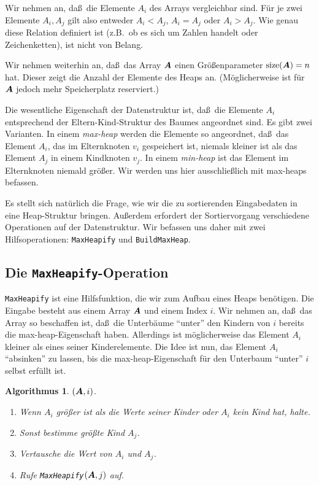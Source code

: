 \documentclass[10pt,reqno]{amsart}
\numberwithin{equation}{section}
\newcommand\vA{\vec A}
\def\vec#1{\mathchoice{\mbox{\boldmath$\displaystyle#1$}}
{\mbox{\boldmath$\textstyle#1$}}
{\mbox{\boldmath$\scriptstyle#1$}}
{\mbox{\boldmath$\scriptscriptstyle#1$}}}
\DeclareMathOperator{\size}{size}
\newtheorem{algorithm}[definition]{Algorithmus}
\begin{document}
Wir nehmen an, da\ss\ die Elemente $A_i$ des Arrays vergleichbar sind.
F\"ur je zwei Elemente $A_i,A_j$ gilt also entweder $A_i<A_j$, $A_i=A_j$ oder $A_i>A_j$.
Wie genau diese Relation definiert ist (z.B.\ ob es sich um Zahlen handelt oder Zeichenketten), ist nicht von Belang.

Wir nehmen weiterhin an, da\ss\ das Array $\vA$ einen Gr\"o\ss enparameter $\size(\vA)=n$ hat.
Dieser zeigt die Anzahl der Elemente des Heaps an.
(M\"oglicherweise ist f\"ur $\vA$ jedoch mehr Speicherplatz reserviert.)

Die wesentliche Eigenschaft der Datenstruktur ist, da\ss\ die Elemente $A_i$ entsprechend der Eltern-Kind-Struktur des Baumes angeordnet sind.
Es gibt zwei Varianten.
In einem {\em max-heap} werden die Elemente so angeordnet, da\ss\ das Element $A_i$, das im Elternknoten $v_i$ gespeichert ist, niemals kleiner ist als das Element $A_j$ in einem Kindknoten $v_j$.
In einem {\em min-heap} ist das Element im Elternknoten niemald gr\"o\ss er.
Wir werden uns hier ausschlie\ss lich mit max-heaps befassen.

Es stellt sich nat\"urlich die Frage, wie wir die zu sortierenden Eingabedaten in eine Heap-Struktur bringen.
Au\ss erdem erfordert der Sortiervorgang verschiedene Operationen auf der Datenstruktur.
Wir befassen uns daher mit zwei Hilfsoperationen: {\tt MaxHeapify} und {\tt BuildMaxHeap}.

\subsection{Die {\tt MaxHeapify}-Operation}\label{sec_maxheapify}
{\tt MaxHeapify} ist eine Hilfsfunktion, die wir zum Aufbau eines Heaps ben\"otigen.
Die Eingabe besteht aus einem Array $\vA$ und einem Index $i$.
Wir nehmen an, da\ss\ das Array so beschaffen ist, da\ss\ die Unterb\"aume ``unter'' den Kindern von $i$ bereits die max-heap-Eigenschaft haben.
Allerdings ist m\"oglicherweise das Element $A_i$ kleiner als eines seiner Kinderelemente.
Die Idee ist nun, das Element $A_i$ ``absinken'' zu lassen, bis die max-heap-Eigenschaft f\"ur den Unterbaum ``unter'' $i$ selbst erf\"ullt ist.

\begin{algorithm}$(\vA,i)$.\label{alg_maxheapify}
	\begin{enumerate}
		\item Wenn $A_i$ gr\"o\ss er ist als die Werte seiner Kinder oder $A_i$ kein Kind hat, halte. 
		\item Sonst bestimme gr\"o\ss te Kind $A_j$.
		\item Vertausche die Wert von $A_i$ und $A_j$.
		\item Rufe {\tt MaxHeapify}$(\vA,j)$ auf.
	\end{enumerate}
\end{algorithm}
\end{document}
